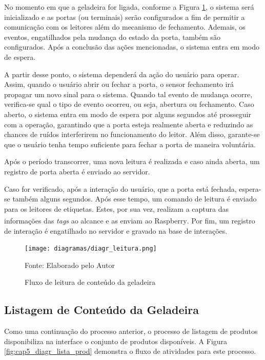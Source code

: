 No momento em que a geladeira for ligada, conforme a Figura \ref{fig:cap5_diagr_leitura}, o sistema será inicializado e as portas (ou terminais) serão configurados a fim de permitir a comunicação com os leitores além do mecanismo de fechamento. Ademais, os eventos, engatilhados pela mudança do estado da porta, também são configurados. Após a conclusão das ações mencionadas, o sistema entra em modo de espera.

A partir desse ponto, o sistema dependerá da ação do usuário para operar. Assim, quando o usuário abrir ou fechar a porta, o sensor fechamento irá propagar um novo sinal para o sistema. Quando tal evento de mudança ocorre, verifica-se qual o tipo de evento ocorreu, ou seja, abertura ou fechamento. Caso aberto, o sistema entra em modo de espera por alguns segundos até prosseguir com a operação, garantindo que a porta esteja realmente aberta e reduzindo as chances de ruídos interferirem no funcionamento do leitor. Além disso, garante-se que o usuário tenha tempo suficiente para fechar a porta de maneira voluntária. 

Após o período transcorrer, uma nova leitura é realizada e caso ainda aberta, um registro de porta aberta é enviado ao servidor. 

Caso for verificado, após a interação do usuário, que a porta está fechada, espera-se também alguns segundos. Após esse tempo, um comando de leitura é enviado para os leitores de etiquetas. Estes, por sua vez, realizam a captura das informações das \textit{tags} ao alcance e as enviam ao Raspberry\textsuperscript{\textregistered}. Por fim, um registro de interação é engatilhado no servidor e gravado na base de interações.

\begin{figure}[htb]
    \caption{Fluxo de leitura de conteúdo da geladeira}
    \label{fig:cap5_diagr_leitura}
    \texttt{[image: diagramas/diagr\_leitura.png]}
    
    \footnotesize{Fonte: Elaborado pelo Autor}
\end{figure}

\subsection{Listagem de Conteúdo da Geladeira}

Como uma continuação do processo anterior, o processo de listagem de produtos disponibiliza na interface o conjunto de produtos disponíveis. A Figura \ref{fig:cap5_diagr_lista_prod} demonstra o fluxo de atividades para este processo.

